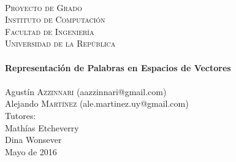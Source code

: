 \begin{titlepage}
  \begin{center}

    \textsc{\LARGE}\\[1.0cm]
    \textsc{\LARGE Proyecto de Grado}\\[1.5cm]

    \textsc{\Large Instituto de Computación}\\[0.2cm]
    \textsc{\Large Facultad de Ingeniería}\\[0.2cm]
    \textsc{\Large Universidad de la República}\\[2.0cm]

    \HRule\\[0.6cm]
    {\Huge \bfseries Representación de Palabras en Espacios de Vectores}\\[0.3cm]
    \HRule\\[2.3cm]

    {\Large Agustín \textsc{Azzinnari}} {\small (aazzinnari@gmail.com)}\\
    {\Large Alejando \textsc{Martínez}} {\small (ale.martinez.uy@gmail.com)}\\[2.0cm]

    {\small Tutores:}\\
    {\normalsize Mathías Etcheverry}\\
    {\normalsize Dina Wonsever}\\[1.5cm]

    Mayo de 2016\\

    \vfill

  \end{center}
\end{titlepage}